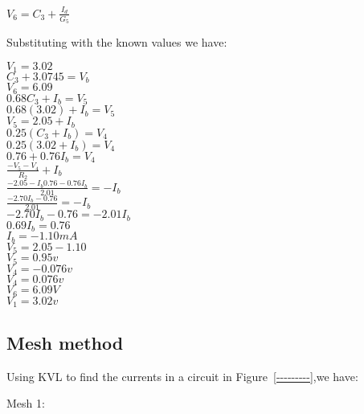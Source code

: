 $V_6=C_3+\frac{I_d}{G_5}$

Substituting with the known values we have:

$V_1=3.02$\\

$C_3+3.0745=V_b$\\

$V_6=6.09$\\

$0.68C_3+I_b=V_5$\\

$0.68(3.02)+I_b=V_5$\\

$V_5=2.05+I_b$\\

$0.25(C_3+I_b)=V_4$\\

$0.25(3.02+I_b)=V_4$\\

$0.76+0.76I_b=V_4$\\

$\frac{-V_5-V_4}{R_2}+I_b$\\


$\frac{-2.05-I_b0.76-0.76I_b}{2.01}=-I_b$\\


$\frac{-2.70I_b-0.76}{2.01}=-I_b$\\


$-2.70I_b-0.76=-2.01I_b$\\

$0.69I_b=0.76$\\

$I_b=-1.10mA$\\

$V_5=2.05-1.10$\\

$V_5=0.95v$\\

$V_4=-0.076v$\\

$V_4=0.076v$\\

$V_6=6.09V$\\

$V_1=3.02v$


\subsection{Mesh method}

Using KVL to find the currents in a circuit in Figure~\ref{---------},we have:

Mesh 1:

